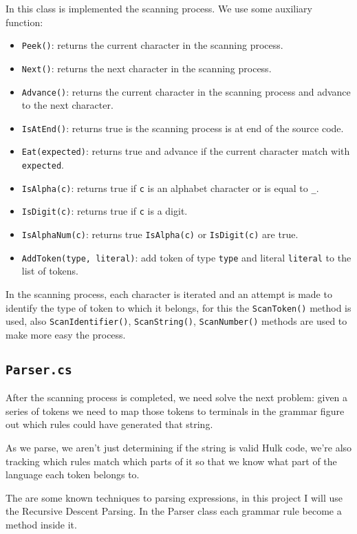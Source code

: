 \documentclass[a4paper, 12pt]{report}
\begin{document}
In this class is implemented the scanning process. We use some auxiliary function:

\begin{itemize}
  \item {\tt Peek()}: returns the current character in the scanning process.
  \item {\tt Next()}: returns the next character in the scanning process.
  \item {\tt Advance()}: returns the current character in the scanning process and advance to the next character.
  \item {\tt IsAtEnd()}: returns true is the scanning process is at end of the source code.
  \item {\tt Eat(expected)}: returns true and advance if the current character match with {\tt expected}.  
  \item {\tt IsAlpha(c)}: returns true if {\tt c} is an alphabet character or is equal to {\tt \_}.
  \item {\tt IsDigit(c)}: returns true if {\tt c} is a digit.
  \item {\tt IsAlphaNum(c)}: returns true {\tt IsAlpha(c)} or {\tt IsDigit(c)} are true.
  \item {\tt AddToken(type, literal)}: add token of type {\tt type} and literal {\tt literal} to the list of tokens.
\end{itemize}

In the scanning process, each character is iterated and an attempt is made to identify the type of token to which it belongs, for
this the {\tt ScanToken()} method is used, also {\tt ScanIdentifier()}, {\tt ScanString()}, {\tt ScanNumber()} methods are used
to make more easy the process.

\subsection*{\tt Parser.cs}

After the scanning process is completed, we need solve the next problem: given a series of tokens we need to map those tokens
to terminals in the grammar figure out which rules could have generated that string.

As we parse, we aren't just determining if the string is valid Hulk code, we're also tracking which rules match which parts of 
it so that we know what part of the language each token belongs to.

The are some known techniques to parsing expressions, in this project I will use the Recursive Descent Parsing. In the Parser class
each grammar rule become a method inside it.
\end{document}
